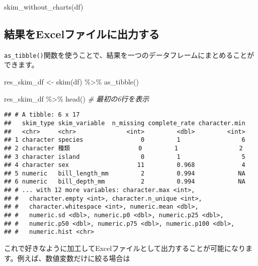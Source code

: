 \documentclass[
  xelatex,ja=standard, b5paper]{bxjsbook}
\newenvironment{Shaded}{\begin{snugshade}}{\end{snugshade}}
\newcommand{\CommentTok}[1]{\textcolor[rgb]{0.56,0.35,0.01}{\textit{#1}}}
\newcommand{\FunctionTok}[1]{\textcolor[rgb]{0.00,0.00,0.00}{#1}}
\newcommand{\NormalTok}[1]{#1}
\newcommand{\OtherTok}[1]{\textcolor[rgb]{0.56,0.35,0.01}{#1}}
\newcommand{\SpecialCharTok}[1]{\textcolor[rgb]{0.00,0.00,0.00}{#1}}
\begin{document}
\begin{Shaded}
\begin{Highlighting}[]
\FunctionTok{skim\_without\_charts}\NormalTok{(df)}
\end{Highlighting}
\end{Shaded}

\hypertarget{ux7d50ux679cux3092excelux30d5ux30a1ux30a4ux30ebux306bux51faux529bux3059ux308b}{%
\subsection{結果をExcelファイルに出力する}\label{ux7d50ux679cux3092excelux30d5ux30a1ux30a4ux30ebux306bux51faux529bux3059ux308b}}

\texttt{as\_tibble()}関数を使うことで、結果を一つのデータフレームにまとめることができます。

\begin{Shaded}
\begin{Highlighting}[]
\NormalTok{res\_skim\_df }\OtherTok{\textless{}{-}} 
\FunctionTok{skim}\NormalTok{(df) }\SpecialCharTok{\%\textgreater{}\%} 
  \FunctionTok{as\_tibble}\NormalTok{()}

\NormalTok{res\_skim\_df }\SpecialCharTok{\%\textgreater{}\%} 
  \FunctionTok{head}\NormalTok{()        }\CommentTok{\# 最初の6行を表示}
\end{Highlighting}
\end{Shaded}

\begin{verbatim}
## # A tibble: 6 x 17
##   skim_type skim_variable  n_missing complete_rate character.min
##   <chr>     <chr>              <int>         <dbl>         <int>
## 1 character species                0         1                 6
## 2 character 種類                   0         1                 2
## 3 character island                 0         1                 5
## 4 character sex                   11         0.968             4
## 5 numeric   bill_length_mm         2         0.994            NA
## 6 numeric   bill_depth_mm          2         0.994            NA
## # ... with 12 more variables: character.max <int>,
## #   character.empty <int>, character.n_unique <int>,
## #   character.whitespace <int>, numeric.mean <dbl>,
## #   numeric.sd <dbl>, numeric.p0 <dbl>, numeric.p25 <dbl>,
## #   numeric.p50 <dbl>, numeric.p75 <dbl>, numeric.p100 <dbl>,
## #   numeric.hist <chr>
\end{verbatim}

これで好きなように加工してExcelファイルとして出力することが可能になります。例えば、数値変数だけに絞る場合は
\end{document}
